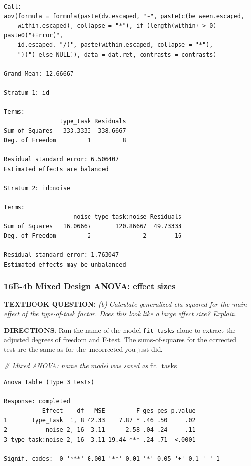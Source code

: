 \documentclass[]{article}
\newenvironment{Shaded}{\begin{snugshade}}{\end{snugshade}}
\newcommand{\CommentTok}[1]{\textcolor[rgb]{0.56,0.35,0.01}{\textit{#1}}}
\newcommand{\NormalTok}[1]{#1}
\begin{document}
\begin{verbatim}

Call:
aov(formula = formula(paste(dv.escaped, "~", paste(c(between.escaped, 
    within.escaped), collapse = "*"), if (length(within) > 0) paste0("+Error(", 
    id.escaped, "/(", paste(within.escaped, collapse = "*"), 
    "))") else NULL)), data = dat.ret, contrasts = contrasts)

Grand Mean: 12.66667

Stratum 1: id

Terms:
                type_task Residuals
Sum of Squares   333.3333  338.6667
Deg. of Freedom         1         8

Residual standard error: 6.506407
Estimated effects are balanced

Stratum 2: id:noise

Terms:
                    noise type_task:noise Residuals
Sum of Squares   16.06667       120.86667  49.73333
Deg. of Freedom         2               2        16

Residual standard error: 1.763047
Estimated effects may be unbalanced
\end{verbatim}

\clearpage

\subsubsection{16B-4b Mixed Design ANOVA: effect
sizes}\label{b-4b-mixed-design-anova-effect-sizes}

\textbf{TEXTBOOK QUESTION:} \emph{(b) Calculate generalized eta squared
for the main effect of the type-of-task factor. Does this look like a
large effect size? Explain.}

\textbf{DIRECTIONS:} Run the name of the model \texttt{fit\_tasks} alone
to extract the adjusted degrees of freedom and F-test. The
sums-of-squares for the corrected test are the same as for the
uncorrected you just did.

\begin{Shaded}
\begin{Highlighting}[]
\CommentTok{# Mixed ANOVA: name the model was saved as}
\NormalTok{fit_tasks}
\end{Highlighting}
\end{Shaded}

\begin{verbatim}
Anova Table (Type 3 tests)

Response: completed
           Effect    df   MSE         F ges pes p.value
1       type_task  1, 8 42.33    7.87 * .46 .50     .02
2           noise 2, 16  3.11      2.58 .04 .24     .11
3 type_task:noise 2, 16  3.11 19.44 *** .24 .71  <.0001
---
Signif. codes:  0 '***' 0.001 '**' 0.01 '*' 0.05 '+' 0.1 ' ' 1
\end{verbatim}
\end{document}
